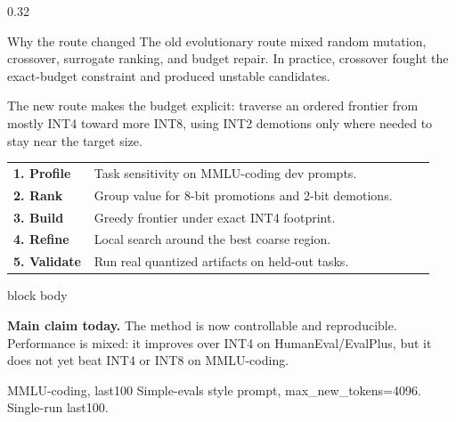 \documentclass[final]{beamer}
\begin{document}
\begin{frame}[t]
\vspace{0.7cm}

\begin{columns}[t,totalwidth=\textwidth]
  \begin{column}{0.32\textwidth}
    \begin{block}{Why the route changed}
      \justifying
      The old evolutionary route mixed random mutation, crossover, surrogate ranking,
      and budget repair. In practice, crossover fought the exact-budget constraint
      and produced unstable candidates.

      \vspace{0.35cm}
      The new route makes the budget explicit: traverse an ordered frontier from
      mostly INT4 toward more INT8, using INT2 demotions only where needed to stay
      near the target size.

      \vspace{0.4cm}
      \begin{tabular}{@{}p{0.18\linewidth}p{0.76\linewidth}@{}}
      \textbf{1. Profile} & Task sensitivity on MMLU-coding dev prompts.\\
      \textbf{2. Rank} & Group value for 8-bit promotions and 2-bit demotions.\\
      \textbf{3. Build} & Greedy frontier under exact INT4 footprint.\\
      \textbf{4. Refine} & Local search around the best coarse region.\\
      \textbf{5. Validate} & Run real quantized artifacts on held-out tasks.\\
      \end{tabular}

      \vspace{0.45cm}
      \begin{beamercolorbox}[rounded=true,wd=\textwidth,sep=0.35cm]{block body}
        \colorbox{PosterGreenSoft}{\parbox{0.94\textwidth}{
        \textbf{Main claim today.}
        The method is now controllable and reproducible. Performance is mixed:
        it improves over INT4 on HumanEval/EvalPlus, but it does not yet beat
        INT4 or INT8 on MMLU-coding.
        }}
      \end{beamercolorbox}
    \end{block}

    \begin{block}{MMLU-coding, last100}
      \small Simple-evals style prompt, max\_new\_tokens=4096. Single-run last100.
      \vspace{0.35cm}


\end{block}
\end{column}
\end{columns}
\end{frame}
\end{document}

